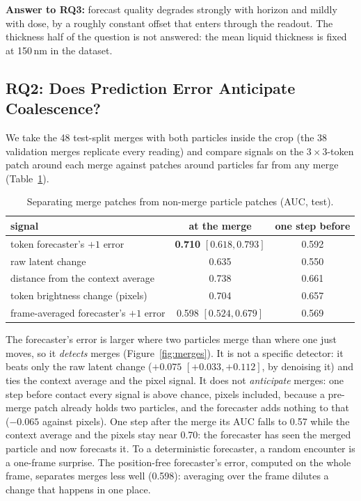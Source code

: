 \noindent\textbf{Answer to RQ3:} forecast quality degrades strongly with horizon and mildly
with dose, by a roughly constant offset that enters through the readout. The thickness
half of the question is not answered: the mean liquid thickness is fixed at 150\,nm in
the dataset.

\subsection{RQ2: Does Prediction Error Anticipate Coalescence?}
\label{sec:res-rq2}

We take the 48 test-split merges with both particles inside the crop (the 38 validation
merges replicate every reading) and compare signals on the $3 \times 3$-token patch around
each merge against patches around particles far from any merge
(Table~\ref{tab:merges}).

\begin{table}[h]
  \centering
  \caption{Separating merge patches from non-merge particle patches (AUC, test).}
  \label{tab:merges}
  \begin{tabular}{lcc}
    \toprule
    signal & at the merge & one step before \\
    \midrule
    token forecaster's $+1$ error & \textbf{0.710} $[0.618, 0.793]$ & 0.592 \\
    raw latent change & 0.635 & 0.550 \\
    distance from the context average & 0.738 & 0.661 \\
    token brightness change (pixels) & 0.704 & 0.657 \\
    frame-averaged forecaster's $+1$ error & 0.598 $[0.524, 0.679]$ & 0.569 \\
    \bottomrule
  \end{tabular}
\end{table}

The forecaster's error is larger where two particles merge than where one just moves,
so it \emph{detects} merges (Figure~\ref{fig:merges}). It is not a specific detector: it beats only the raw latent
change ($+0.075$ $[+0.033, +0.112]$, by denoising it) and ties the context average and the
pixel signal. It does not \emph{anticipate} merges: one step before contact every signal
is above chance, pixels included, because a pre-merge patch already holds two particles,
and the forecaster adds nothing to that ($-0.065$ against pixels). One step after the
merge its AUC falls to 0.57 while the context average and the pixels stay near 0.70: the
forecaster has seen the merged particle and now forecasts it. To a deterministic
forecaster, a random encounter is a one-frame surprise. The position-free forecaster's
error, computed on the whole frame, separates merges less well (0.598): averaging over the
frame dilutes a change that happens in one place.

